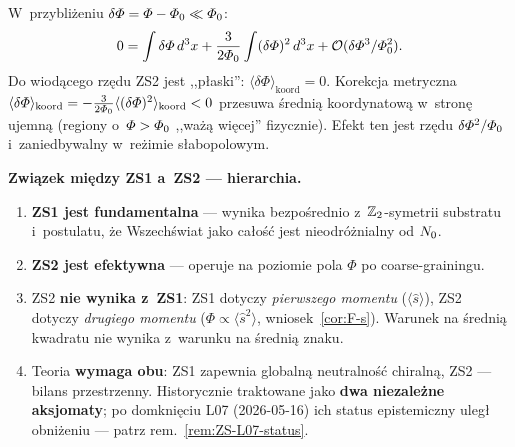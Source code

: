 \begin{remark}
\begin{remark}[Autoreferencyjno\'s\'c ZS2]
W~przybli\.zeniu $\delta\varPhi = \varPhi - \varPhi_0 \ll \varPhi_0$:
\begin{equation}\label{eq:ZS2-expansion}
  0 = \int\delta\varPhi\,d^3x
    + \frac{3}{2\varPhi_0}\int(\delta\varPhi)^2\,d^3x
    + \mathcal{O}(\delta\varPhi^3/\varPhi_0^2).
\end{equation}
Do wiod\k{a}cego rz\k{e}du ZS2 jest ,,p\l{}aski'':
$\langle\delta\Phi\rangle_{\mathrm{koord}} = 0$.
Korekcja metryczna
$\langle\delta\varPhi\rangle_{\mathrm{koord}}
= -\frac{3}{2\varPhi_0}\langle(\delta\varPhi)^2\rangle_{\mathrm{koord}}
< 0$
przesuwa \'sredni\k{a} koordynatow\k{a} w~stron\k{e} ujemn\k{a}
(regiony o~$\varPhi > \varPhi_0$ ,,wa\.z\k{a} wi\k{e}cej'' fizycznie).
Efekt ten jest rz\k{e}du $\delta\varPhi^2/\varPhi_0$
i~zaniedbywalny w~re\.zimie s\l{}abopolowym.
\end{remark}

\medskip\noindent
\textbf{Zwi\k{a}zek mi\k{e}dzy ZS1 a~ZS2 --- hierarchia.}
\begin{enumerate}[nosep]
  \item \textbf{ZS1 jest fundamentalna} --- wynika
    bezpo\'srednio z~$\mathbb{Z}_2$-symetrii substratu i~postulatu,
    \.ze Wszech\'swiat jako ca\l{}o\'s\'c jest
    nieodr\'o\.znialny od $N_0$.
  \item \textbf{ZS2 jest efektywna} --- operuje na poziomie
    pola $\Phi$ po coarse-grainingu.
  \item ZS2 \textbf{nie wynika z~ZS1}: ZS1 dotyczy
    \emph{pierwszego momentu} ($\langle\hat{s}\rangle$),
    ZS2 dotyczy \emph{drugiego momentu}
    ($\Phi \propto \langle\hat{s}^2\rangle$,
    wniosek~\ref{cor:F-s}). Warunek na \'sredni\k{a}
    kwadratu nie wynika z~warunku na \'sredni\k{a} znaku.
  \item Teoria \textbf{wymaga obu}: ZS1 zapewnia globaln\k{a}
    neutralno\'s\'c chiraln\k{a}, ZS2 --- bilans przestrzenny.
    Historycznie traktowane jako \textbf{dwa niezale\.zne aksjomaty};
    po domkni\k{e}ciu L07 (2026-05-16) ich status epistemiczny
    uleg\l{} obni\.zeniu --- patrz rem.~\ref{rem:ZS-L07-status}.
\end{enumerate}
\end{remark}

